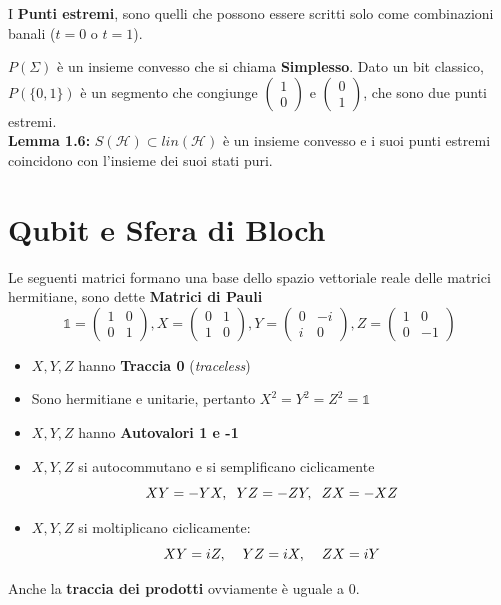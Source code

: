 \documentclass{report}
\begin{document}
I \textbf{Punti estremi}, sono quelli che possono essere scritti solo come combinazioni banali ($t=0$ o $t=1$).

$P(\Sigma)$ è un insieme convesso che si chiama \textbf{Simplesso}. Dato un bit classico, $P(\{0,1\})$ è un segmento che congiunge $\begin{pmatrix}
    1 \\ 0
\end{pmatrix}
\text{ e }
\begin{pmatrix}
    0\\1
\end{pmatrix}
$, che sono due punti estremi.
\medskip
\\ \textbf{Lemma 1.6:} $S(\mathcal{H}) \subset \textit{lin}(\mathcal{H})$ è un insieme convesso e i suoi punti estremi coincidono con l'insieme dei suoi stati puri. 

\section{Qubit e Sfera di Bloch}
Le seguenti  matrici formano una base dello spazio vettoriale reale delle matrici hermitiane, sono dette \textbf{Matrici di Pauli}
$$
\mathbb{1}=
\begin{pmatrix}
    1 & 0\\
    0 & 1
\end{pmatrix}
, X =
\begin{pmatrix}
    0 & 1\\
    1 & 0
\end{pmatrix}
, Y=
\begin{pmatrix}
    0 & -i\\
    i & 0
\end{pmatrix}
, Z =
\begin{pmatrix}
    1 & 0 \\
    0 & -1
\end{pmatrix}
$$
\begin{itemize}
    \item $X,Y,Z$ hanno \textbf{Traccia 0} (\textit{traceless})
    \item Sono hermitiane e unitarie, pertanto $X^2=Y^2=Z^2=\mathbb{1}$
    \item $X,Y,Z$ hanno \textbf{Autovalori 1 e -1}
    \item $X,Y,Z$ si autocommutano e si semplificano ciclicamente
    $$XY = -YX, \hspace{0.2cm} YZ = -ZY,  \hspace{0.2cm} ZX = -XZ$$
    \item $X,Y,Z$ si moltiplicano ciclicamente:
    $$XY = iZ, \hspace{0.4cm} YZ = iX,  \hspace{0.4cm} ZX = iY$$ 
\end{itemize}
Anche la \textbf{traccia dei prodotti} ovviamente è uguale a 0.
\end{document}
